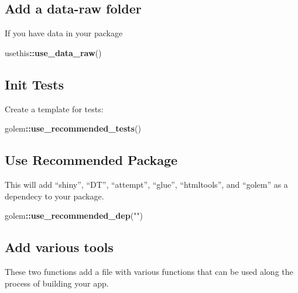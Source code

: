 \documentclass[]{book}
\newenvironment{Shaded}{\begin{snugshade}}{\end{snugshade}}
\newcommand{\KeywordTok}[1]{\textcolor[rgb]{0.13,0.29,0.53}{\textbf{#1}}}
\newcommand{\NormalTok}[1]{#1}
\newcommand{\OperatorTok}[1]{\textcolor[rgb]{0.81,0.36,0.00}{\textbf{#1}}}
\newcommand{\StringTok}[1]{\textcolor[rgb]{0.31,0.60,0.02}{#1}}
\begin{document}
\hypertarget{add-a-data-raw-folder}{%
\subsection{Add a data-raw folder}\label{add-a-data-raw-folder}}

If you have data in your package

\begin{Shaded}
\begin{Highlighting}[]
\NormalTok{usethis}\OperatorTok{::}\KeywordTok{use_data_raw}\NormalTok{()}
\end{Highlighting}
\end{Shaded}

\hypertarget{init-tests}{%
\subsection{Init Tests}\label{init-tests}}

Create a template for tests:

\begin{Shaded}
\begin{Highlighting}[]
\NormalTok{golem}\OperatorTok{::}\KeywordTok{use_recommended_tests}\NormalTok{()}
\end{Highlighting}
\end{Shaded}

\hypertarget{use-recommended-package}{%
\subsection{Use Recommended Package}\label{use-recommended-package}}

This will add ``shiny'', ``DT'', ``attempt'', ``glue'', ``htmltools'', and ``golem'' as a dependecy to your package.

\begin{Shaded}
\begin{Highlighting}[]
\NormalTok{golem}\OperatorTok{::}\KeywordTok{use_recommended_dep}\NormalTok{(}\StringTok{""}\NormalTok{)}
\end{Highlighting}
\end{Shaded}

\hypertarget{add-various-tools}{%
\subsection{Add various tools}\label{add-various-tools}}

These two functions add a file with various functions that can be used along the process of building your app.
\end{document}
